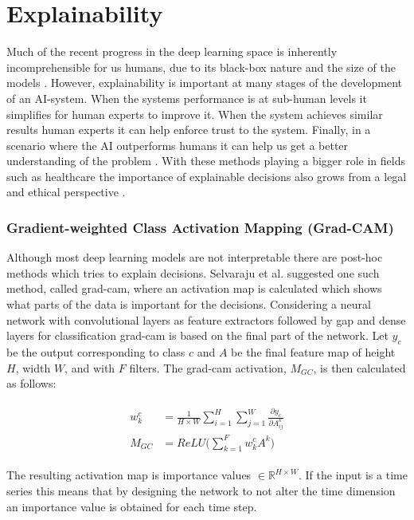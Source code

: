 \section{Explainability} \label{sec:explainability}
Much of the recent progress in the deep learning space is inherently incomprehensible for us humans, due to its black-box nature and the size of the models \cite{Du2018}. However, explainability is important at many stages of the development of an AI-system. When the systems performance is at sub-human levels it simplifies for human experts to improve it. When the system achieves similar results human experts it can help enforce trust to the system. Finally, in a scenario where the AI outperforms humans it can help us get a better understanding of the problem \cite{Selvaraju2016}. With these methods playing a bigger role in fields such as healthcare the importance of explainable decisions also grows from a legal and ethical perspective \cite{Amann2020}.

\subsubsection{Gradient-weighted Class Activation Mapping (Grad-CAM)} \label{sec:grad-cam}
Although most deep learning models are not interpretable there are post-hoc methods which tries to explain decisions. Selvaraju et al. \cite{Selvaraju2016} suggested one such method, called \gls{grad-cam}, where an activation map is calculated which shows what parts of the data is important for the decisions. Considering a neural network with convolutional layers as feature extractors followed by \gls{gap} and dense layers for classification \gls{grad-cam} is based on the final part of the network. Let $y_c$ be the output corresponding to class $c$ and $A$ be the final feature map of height $H$, width $W$, and with $F$ filters. The \gls{grad-cam} activation, $M_{GC}$, is then calculated as follows:

\begin{align}
 \begin{split}
  w_k^c &= \frac{1}{H \times W} \sum_{i=1}^H \sum_{j=1}^W \frac{\partial y_c}{\partial A_{ij}^k} \\
  M_{GC} &= ReLU \big ( \sum_{k=1}^F w_k^c A^k \big)
  \label{eq:grad-cam}
 \end{split}
\end{align}

The resulting activation map is importance values $\in \mathbb{R}^{H \times W}$. If the input is a time series this means that by designing the network to not alter the time dimension an importance value is obtained for each time step.


